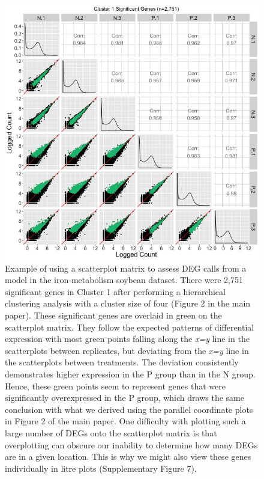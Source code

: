 \documentclass{article}
\begin{document}
  \clearpage
  \null
  \begin{figure}[t!]
  \centerline{\includegraphics[width=\columnwidth]{../MakeFigures/sbIRClusterSigSM1.jpg}}
  \caption{Example of using a scatterplot matrix to assess DEG calls from a model in the iron-metabolism soybean dataset. There were 2,751 significant genes in Cluster 1 after performing a hierarchical clustering analysis with a cluster size of four (Figure 2 in the main paper). These significant genes are overlaid in green on the scatterplot matrix. They follow the expected patterns of differential expression with most green points falling along the \textit{x=y} line in the scatterplots between replicates, but deviating from the \textit{x=y} line in the scatterplots between treatments. The deviation consistently demonstrates higher expression in the P group than in the N group. Hence, these green points seem to represent genes that were significantly overexpressed in the P group, which draws the same conclusion with what we derived using the parallel coordinate plots in Figure 2 of the main paper. One difficulty with plotting such a large number of DEGs onto the scatterplot matrix is that overplotting can obscure our inability to determine how many DEGs are in a given location. This is why we might also view these genes individually in litre plots (Supplementary Figure 7).
  \label{sbIRClusterSigSM1}}
  \end{figure}
  
\end{document}
